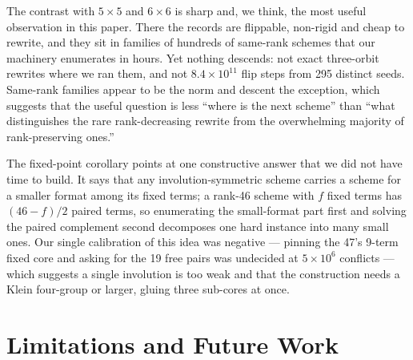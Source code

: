\documentclass[11pt]{article}
\begin{document}
The contrast with $5\times5$ and $6\times6$ is sharp and, we think, the most useful observation in this
paper. There the records are flippable, non-rigid and cheap to rewrite, and they sit in families of
hundreds of same-rank schemes that our machinery enumerates in hours. Yet nothing descends: not exact
three-orbit rewrites where we ran them, and not $8.4\times10^{11}$ flip steps from 295 distinct seeds.
Same-rank families appear to be the norm and descent the exception, which suggests that the useful
question is less ``where is the next scheme'' than ``what distinguishes the rare rank-decreasing rewrite
from the overwhelming majority of rank-preserving ones.''

The fixed-point corollary points at one constructive answer that we did not have time to build. It says
that any involution-symmetric scheme carries a scheme for a smaller format among its fixed terms; a
rank-46 scheme with $f$ fixed terms has $(46-f)/2$ paired terms, so enumerating the small-format part
first and solving the paired complement second decomposes one hard instance into many small ones. Our
single calibration of this idea was negative --- pinning the 47's 9-term fixed core and asking for the 19
free pairs was undecided at $5\times10^6$ conflicts --- which suggests a single involution is too weak and
that the construction needs a Klein four-group or larger, gluing three sub-cores at once.

\section{Limitations and Future Work}
\label{sec:future}
\end{document}
